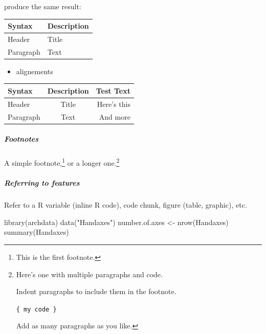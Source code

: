 \documentclass[
]{article}
\newenvironment{Shaded}{\begin{snugshade}}{\end{snugshade}}
\newcommand{\FunctionTok}[1]{\textcolor[rgb]{0.00,0.00,0.00}{#1}}
\newcommand{\NormalTok}[1]{#1}
\newcommand{\OtherTok}[1]{\textcolor[rgb]{0.56,0.35,0.01}{#1}}
\newcommand{\StringTok}[1]{\textcolor[rgb]{0.31,0.60,0.02}{#1}}
\providecommand{\tightlist}{%
  \setlength{\itemsep}{0pt}\setlength{\parskip}{0pt}}
\begin{document}
produce the same result:

\begin{longtable}[]{@{}ll@{}}
\toprule
Syntax & Description \\
\midrule
\endhead
Header & Title \\
Paragraph & Text \\
\bottomrule
\end{longtable}

\begin{itemize}
\tightlist
\item
  alignements
\end{itemize}

\begin{longtable}[]{@{}lcr@{}}
\toprule
Syntax & Description & Test Text \\
\midrule
\endhead
Header & Title & Here's this \\
Paragraph & Text & And more \\
\bottomrule
\end{longtable}

\hypertarget{footnotes}{%
\subparagraph{Footnotes}\label{footnotes}}

A simple footnote,\footnote{This is the first footnote.} or a longer
one.\footnote{Here's one with multiple paragraphs and code.

  Indent paragraphs to include them in the footnote.

  \texttt{\{\ my\ code\ \}}

  Add as many paragraphs as you like.}

\hypertarget{referring-to-features}{%
\subparagraph{Referring to features}\label{referring-to-features}}

Refer to a R variable (inline R code), code chunk, figure (table,
graphic), etc.

\begin{Shaded}
\begin{Highlighting}[]
\FunctionTok{library}\NormalTok{(archdata)}
\FunctionTok{data}\NormalTok{(}\StringTok{"Handaxes"}\NormalTok{)}
\NormalTok{number.of.axes }\OtherTok{\textless{}{-}} \FunctionTok{nrow}\NormalTok{(Handaxes)}
\FunctionTok{summary}\NormalTok{(Handaxes)}
\end{Highlighting}
\end{Shaded}
\end{document}
